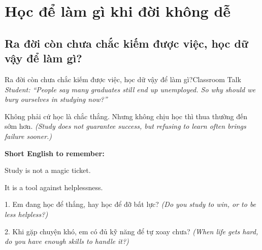 \chapter{Học để làm gì khi đời không dễ}

\section{Ra đời còn chưa chắc kiếm được việc, học dữ vậy để làm gì?}
\begin{truyen}{Ra đời còn chưa chắc kiếm được việc, học dữ vậy để làm gì?}{Classroom Talk}
\textit{Student: ``People say many graduates still end up unemployed. So why should we bury ourselves in studying now?''}\\[4pt]



\end{truyen}

\begin{baihoc}
Không phải cứ học là chắc thắng. Nhưng không chịu học thì thua thường đến sớm hơn.
\textit{(Study does not guarantee success, but refusing to learn often brings failure sooner.)}
\end{baihoc}

\begin{ghinhoanh}
\textbf{Short English to remember:}

Study is not a magic ticket.

It is a tool against helplessness.
\end{ghinhoanh}

\begin{tuhocnhanh}
1. Em đang học để thắng, hay học để đỡ bất lực? \textit{(Do you study to win, or to be less helpless?)}

2. Khi gặp chuyện khó, em có đủ kỹ năng để tự xoay chưa? \textit{(When life gets hard, do you have enough skills to handle it?)}
\end{tuhocnhanh}
\ngancach

